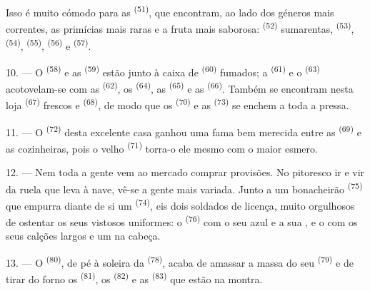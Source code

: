 Isso é muito cómodo para as  \textsuperscript{(51)}, que
encontram, ao lado dos géneros mais correntes, as primícias mais raras e a
fruta mais saborosa:  \textsuperscript{(52)} sumarentas,
 \textsuperscript{(53)},  \textsuperscript{(54)},
 \textsuperscript{(55)},  \textsuperscript{(56)} e
 \textsuperscript{(57)}.

\VUsaut{4.0mm}
\VUsaut{3.0mm}

10. --- O  \textsuperscript{(58)} e as 
\textsuperscript{(59)} estão junto à caixa de  \textsuperscript{(60)}
fumados; a  \textsuperscript{(61)} e o 
\textsuperscript{(63)} acotovelam-se com as  \textsuperscript{(62)}, os
 \textsuperscript{(64)}, as  \textsuperscript{(65)} e
as  \textsuperscript{(66)}. Também se encontram nesta loja
 \textsuperscript{(67)} frescos e 
\textsuperscript{(68)}, de modo que os  \textsuperscript{(70)} e as
 \textsuperscript{(73)} se enchem a toda a pressa.

11. --- O  \textsuperscript{(72)} desta excelente casa ganhou uma fama
bem merecida entre as  \textsuperscript{(69)} e as cozinheiras,
pois o velho  \textsuperscript{(71)} torra-o ele mesmo com o
maior esmero.

\VUsaut{4.0mm}
\VUsaut{3.0mm}

12. --- Nem toda a gente vem ao mercado comprar provisões. No pitoresco ir
e vir da ruela que leva à nave, vê-se a gente mais variada. Junto a um
bonacheirão  \textsuperscript{(75)} que empurra diante de si um
 \textsuperscript{(74)}, eis dois soldados de licença,
muito orgulhosos de ostentar os seus vistosos uniformes: o 
\textsuperscript{(76)} com o seu  azul e a sua , e o  com os seus calções largos e um
 na cabeça.

13. --- O  \textsuperscript{(80)}, de pé à soleira da
 \textsuperscript{(78)}, acaba de amassar a massa do seu
 \textsuperscript{(79)} e de tirar do forno os 
\textsuperscript{(81)}, os  \textsuperscript{(82)} e as 
\textsuperscript{(83)} que estão na montra.

